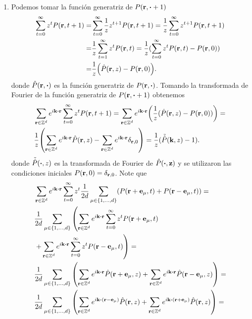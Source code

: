 \documentclass{article}
\begin{document}
\begin{enumerate}
\item Podemos tomar la función generatriz de $P(\vb{r},\vdot +1)$
\begin{align}
\begin{split}
\sum_{t=0}^\infty z^t P(\vb{r},t+1)=&\sum_{t=0}^\infty \frac{1}{z}z^{t+1}P(\vb{r},t+1)=\frac{1}{z}\sum_{t=0}^\infty z^{t+1}P(\vb{r},t+1)\\
=&\frac{1}{z}\sum_{t=1}^\infty z^{t}P(\vb{r},t)=\frac{1}{z}(\sum_{t=0}^\infty z^{t}P(\vb{r},t)-P(\vb{r},0))\\
=&\frac{1}{z}\qty(\hat{P}(\vb{r},z)-P(\vb{r},0)).
\end{split}
\end{align}
donde $\hat{P}(\vb{r},\vdot)$ es la función generatriz de $P(\vb{r},\vdot)$. Tomando la transformada de Fourier de la función generatriz de $P(\vb{r},\vdot +1)$ obtenemos
\begin{align}
\begin{split}
&\sum_{\vb{r}\in\mathbb{Z}^d}e^{i\vb{k}\vdot\vb{r}}\sum_{t=0}^\infty z^t P(\vb{r},t+1)=\sum_{\vb{r}\in\mathbb{Z}^d}e^{i\vb{k}\vdot\vb{r}}\qty(\frac{1}{z}(\hat{P}(\vb{r},z)-P(\vb{r},0)))=\\
&\frac{1}{z}\qty(\sum_{\vb{r}\in\mathbb{Z}^d}e^{i\vb{k}\vdot\vb{r}}\hat{P}(\vb{r},z)-\sum_{\vb{r}\in\mathbb{Z}^d}e^{i\vb{k}\vdot\vb{r}}\delta_{\vb{r},0})=\frac{1}{z}(\tilde{\hat{P}}(\vb{k},z)-1).
\end{split}
\end{align}
donde $\tilde{\hat{P}}(\vdot,z)$ es la transformada de Fourier de $\hat{P}(\vdot,\vb{z})$ y se utilizaron las condiciones iniciales $P(\vb{r},0)=\delta_{\vb{r},0}$. Note que
\begin{align}
\begin{split}
&\sum_{\vb{r}\in\mathbb{Z}^d}e^{i\vb{k}\vdot\vb{r}}\sum_{t=0}^\infty z^t\frac{1}{2d}\sum_{\mu\in\{1,\dots,d\}}(P(\vb{r}+\vb{e}_\mu,t)+P(\vb{r}-\vb{e}_\mu,t))=\\
&\frac{1}{2d}\sum_{\mu\in\{1,\dots,d\}}\left(\sum_{\vb{r}\in\mathbb{Z}^d}e^{i\vb{k}\vdot\vb{r}}\sum_{t=0}^\infty z^tP(\vb{r}+\vb{e}_\mu,t)\right.\\
&\left.+\sum_{\vb{r}\in\mathbb{Z}^d}e^{i\vb{k}\vdot\vb{r}}\sum_{t=0}^\infty z^tP(\vb{r}-\vb{e}_\mu,t)\right)=\\
&\frac{1}{2d}\sum_{\mu\in\{1,\dots,d\}}\qty(\sum_{\vb{r}\in\mathbb{Z}^d}e^{i\vb{k}\vdot\vb{r}}\hat{P}(\vb{r}+\vb{e}_\mu,z)+\sum_{\vb{r}\in\mathbb{Z}^d}e^{i\vb{k}\vdot\vb{r}}\hat{P}(\vb{r}-\vb{e}_\mu,z))=\\
&\frac{1}{2d}\sum_{\mu\in\{1,\dots,d\}}\qty(\sum_{\vb{r}\in\mathbb{Z}^d}e^{i\vb{k}\vdot(\vb{r}-\vb{e}_\mu)}\hat{P}(\vb{r},z)+\sum_{\vb{r}\in\mathbb{Z}^d}e^{i\vb{k}\vdot(\vb{r}+\vb{e}_\mu)}\hat{P}(\vb{r},z))=\\

\end{split}
\end{align}
\end{enumerate}
\end{document}
